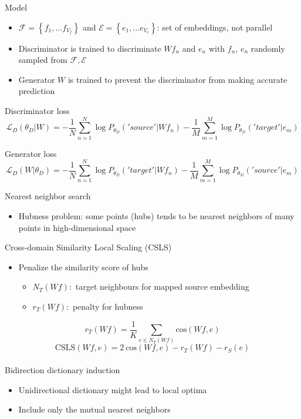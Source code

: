 \documentclass[11pt, a4paper, landscape]{article}
\begin{document}
	
	\NewPage
	\vfill
	Model
	\begin{itemize}
		\item  ${\mathcal{F} = \left\{ f_1, \ldots f_{V_f} \right\} }$ and  ${\mathcal{E} = \left\{ e_1, \ldots e_{V_e} \right\} }$: set of embeddings, not parallel
		\item Discriminator is trained to discriminate ${W{f_n}}$ and ${e_n}$ with ${f_n}$, ${e_n}$ randomly sampled from ${ \mathcal{F},  \mathcal{E} }$ 
		\item Generator ${W}$ is trained to prevent the discriminator from making accurate prediction
		
	\end{itemize}
	
	
	
	Discriminator loss
	\[ \mathcal{L}_D(\theta_D|W) = -\frac{1}{N}\sum_{n=1}^{N}\log P_{\theta_D}('source'| W f_n) - \frac{1}{M}\sum_{m=1}^{M}\log P_{\theta_D}('target'| e_m)\]
	
	
	Generator  loss 
	\[ \mathcal{L}_D(W|\theta_D) = -\frac{1}{N}\sum_{n=1}^{N}\log P_{\theta_D}('target'| W f_n) - \frac{1}{M}\sum_{m=1}^{M}\log P_{\theta_D}('source'| e_m)\]
	



	\NewPage
	\vfill
	Nearest neighbor search
	\begin{itemize}
		\item Hubness problem: some points (hubs) tends to be nearest neighbors of many points in high-dimensional space\\
	\end{itemize}
	Cross-domain Similarity Local Scaling (CSLS)
	\begin{itemize}

		\item Penalize the similarity score of hubs
			\begin{itemize}
				\item $N_T(Wf):$ target neighbours for mapped source embedding
				\item $r_T(W f):$ penalty for hubness
			\end{itemize}
	\end{itemize}
	\[r_T(W f) = \frac{1}{K} \sum_{e \in N_T(Wf)}\textrm{cos}(Wf, e) \]
	\[ \textrm{CSLS}(Wf, e) = 2\ \textrm{cos}(Wf, e)-r_{T}(Wf)-r_{S}(e)\]\\
	Bidirection dictionary induction
	\begin{itemize}
		\item Unidirectional dictionary might lead to local optima
		\item Include only the mutual nearest neighbors 
	\end{itemize}
	\vfill
	
\end{document}
